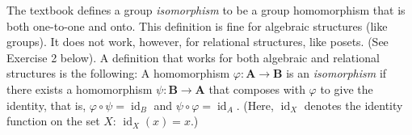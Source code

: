 \documentclass[12pt,reqno]{amsart}
\newcommand{\bA}{\ensuremath{\mathbf{A}}}
\newcommand{\bB}{\ensuremath{\mathbf{B}}}
\newcommand{\<}{\ensuremath{\langle}}
\renewcommand{\>}{\ensuremath{\rangle}}
\begin{document}
\vskip5mm

\noindent The textbook defines a group \emph{isomorphism} to be a group homomorphism that is both
one-to-one and onto.  This definition is fine for algebraic structures (like
groups).  
It does not work, however, for relational structures, like posets. (See Exercise 2 below).
A definition that works for both algebraic and relational structures is the following:
A homomorphism $\varphi : \bA \rightarrow \bB$ is an \emph{isomorphism} if there
exists a homomorphism $\psi: \bB \rightarrow \bA$ that composes with
$\varphi$ to give the identity, that is,
$\varphi \circ \psi = \operatorname{id}_B$
and $\psi \circ \varphi= \operatorname{id}_A$. (Here, $\operatorname{id}_X$
denotes the identity function on the set $X$: $\operatorname{id}_X(x) = x$.)

\newpage

\end{document}
